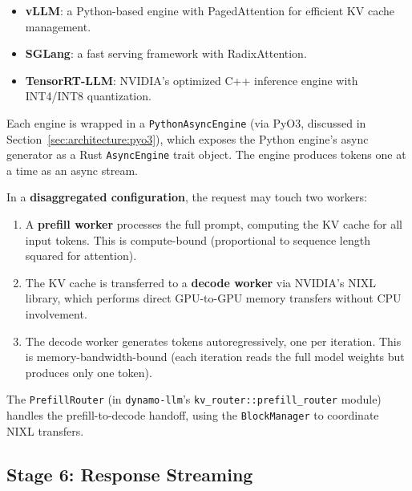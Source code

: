 \begin{itemize}
  \item \textbf{vLLM}: a Python-based engine with PagedAttention for efficient KV cache management.
  \item \textbf{SGLang}: a fast serving framework with RadixAttention.
  \item \textbf{TensorRT-LLM}: NVIDIA's optimized C++ inference engine with INT4/INT8 quantization.
\end{itemize}

Each engine is wrapped in a \texttt{PythonAsyncEngine} (via PyO3, discussed in Section~\ref{sec:architecture:pyo3}), which exposes the Python engine's async generator as a Rust \texttt{AsyncEngine} trait object. The engine produces tokens one at a time as an async stream.

%

%
In a \textbf{disaggregated configuration}, the request may touch two workers:
\begin{enumerate}
  \item A \textbf{prefill worker} processes the full prompt, computing the KV cache for all input tokens. This is compute-bound (proportional to sequence length squared for attention).
  \item The KV cache is transferred to a \textbf{decode worker} via NVIDIA's NIXL library, which performs direct GPU-to-GPU memory transfers without CPU involvement.
  \item The decode worker generates tokens autoregressively, one per iteration. This is memory-bandwidth-bound (each iteration reads the full model weights but produces only one token).
\end{enumerate}

The \texttt{PrefillRouter} (in \texttt{dynamo-llm}'s \texttt{kv\_router::prefill\_router} module) handles the prefill-to-decode handoff, using the \texttt{BlockManager} to coordinate NIXL transfers.

\subsection{Stage 6: Response Streaming}

